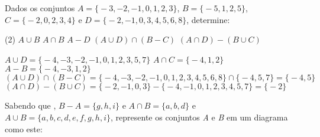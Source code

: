 \documentclass[a4paper,11pt,addpoints]{exam}
\begin{document}
\begin{questions}
\question[2] 
  Dados os conjuntos $A = \big\{-3,-2,-1,0,1,2,3\big\}$, $B = \big\{-5,1,2,5\big\}$, $C = \big\{-2,0,2,3,4\big\}$ e $D = \big\{-2,-1,0,3,4,5,6,8\big\}$, determine:
  \begin{tasks}(2)
    \task $A \cup B$
    \task $A \cap B$
    \task $A - D$
    \task $(A \cup D) \cap (B - C)$
    \task $(A \cap D) - (B \cup C)$
  \end{tasks}

\begin{solution}[1in]
  \begin{tasks}
    \task $A \cup D = \big\{-4,-3,-2,-1,0,1,2,3,5,7\big\}$
    \task $A \cap C = \big\{-4,1,2\big\}$
    \task $A - B = \big\{-4,-3,1,2\big\}$
    \task $(A \cup D) \cap (B - C) = \big\{-4,-3,-2,-1,0,1,2,3,4,5,6,8\big\} \cap \big\{-4,5,7\big\} = \big\{-4,5\big\}$
    \task $(A \cap D) - (B \cup C) = \big\{-2,-1,0,3\big\} - \big\{-4,-1,0,1,2,3,4,5,7\big\} = \big\{-2\big\}$
  \end{tasks}
\end{solution}

\question[1]
  Sabendo que , $B - A = \big\{g,h,i\big\}$ e $A \cap B = \big\{a, b, d\big\}$ e $A \cup B = \big\{a,b,c,d,e,f,g,h,i\big\}$, represente os conjuntos \textit{A} e \textit{B} em um diagrama como este:

  \begin{center}
  \end{center}

\begin{solution}
  \begin{center}
\end{center}
\end{solution}
\end{questions}
\end{document}

